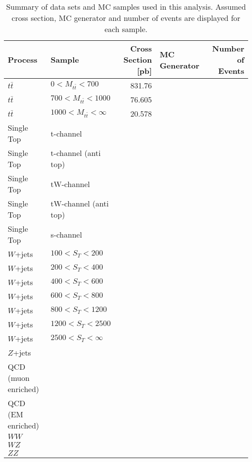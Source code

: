 	\begin{landscape}
	\begin{table}
	\centering
	 \begin{tabular}{|l|l|r|l|r|}
	 	\hline
	 	Process & Sample & Cross Section [pb] & MC Generator & Number of Events \\
	 	\hline
	 	$t\bar{t}$ & $0 < M_{t\bar{t}} < 700$ & 831.76 & & \\
	 	$t\bar{t}$ & $700 < M_{t\bar{t}} < 1000$ & 76.605 & & \\
	 	$t\bar{t}$ & $1000 < M_{t\bar{t}} < \infty$ & 20.578 & & \\
	 	\hline
		Single Top &t-channel  & & & \\
		Single Top & t-channel (anti top) & & & \\
		Single Top & tW-channel & & & \\
		Single Top & tW-channel (anti top) & & & \\
		Single Top & s-channel & & & \\
		$W$+jets & $100 < S_T < 200$ & & & \\
	 	$W$+jets & $200 < S_T < 400$ & & & \\
	 	$W$+jets & $400 < S_T < 600$ & & & \\
	 	$W$+jets & $600 < S_T < 800$ & & & \\
	 	$W$+jets & $800 < S_T < 1200$ & & & \\
	 	$W$+jets & $1200 < S_T < 2500$ & & & \\
	 	$W$+jets & $2500 < S_T < \infty$ & & & \\
	 	$Z$+jets & & & & \\
	 	QCD (muon enriched) & & & & \\
	 	QCD (EM enriched) & & & & \\
	 	$WW$& & & & \\
	 	$WZ$& & & & \\
	 	$ZZ$& & & & \\
	 	 \hline
	 \end{tabular}
	\caption{Summary of data sets and MC samples used in this analysis. Assumed cross section, MC generator and number of events are displayed for each sample.}
	\label{MC_Tab}	
	\end{table}
	\end{landscape}